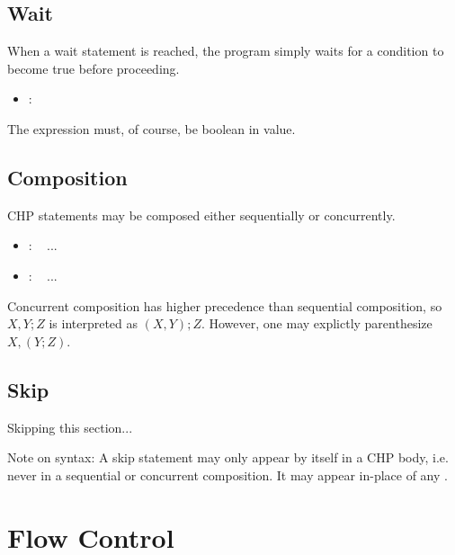 \subsection{Wait}
\label{sec:chp:stmts:wait}

When a wait statement is reached, the program simply waits for a condition
to become true before proceeding.  

\begin{itemize}
\item {} : \ttt{[}  \ttt{]}
\end{itemize}

The expression must, of course, be boolean in value.  

\subsection{Composition}
\label{sec:chp:stmts:comp}

CHP statements may be composed either sequentially or concurrently.  

\begin{itemize}
\item {} :  \seq\  ...
\item {} :  \concur\  ...
\end{itemize}

Concurrent composition has higher precedence than sequential composition, 
so $X,Y;Z$ is interpreted as $(X,Y);Z$.  
However, one may explictly parenthesize $X,(Y;Z)$.  


\subsection{Skip}
\label{sec:chp:stmts:skip}

Skipping this section...

Note on syntax: A skip statement may only appear by itself in a 
CHP body, i.e. never in a sequential or concurrent composition.  
It may appear in-place of any .  

\section{Flow Control}
\label{sec:chp:flow}

